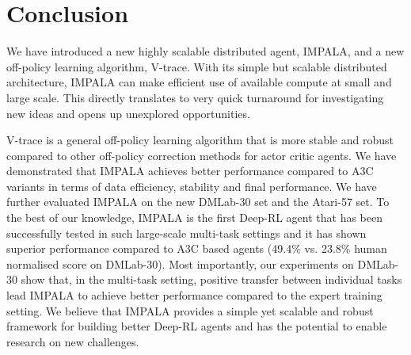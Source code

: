 \section{Conclusion}
We have introduced a new highly scalable distributed agent, IMPALA, and a new off-policy learning algorithm, V-trace. 
With its simple but scalable distributed architecture, IMPALA can make efficient use of available compute at small and large scale.
This directly translates to very quick turnaround for investigating new ideas and opens up unexplored opportunities.

V-trace is a general off-policy learning algorithm that is more stable and robust compared to other off-policy correction methods for actor critic agents. We have demonstrated that IMPALA achieves better performance compared to A3C variants in terms of data efficiency, stability and final performance. We have further evaluated IMPALA on the new DMLab-30 set and the Atari-57 set. To the best of our knowledge, IMPALA is the first Deep-RL agent that has been successfully tested in such large-scale multi-task settings and it has shown superior performance compared to A3C based agents (49.4\% vs. 23.8\% human normalised score on DMLab-30). Most importantly, our experiments on DMLab-30 show that, in the multi-task setting, positive transfer between individual tasks lead IMPALA to achieve better performance compared to the expert training setting. We believe that IMPALA provides a simple yet scalable and robust framework for building better Deep-RL agents and has the potential to enable research on new challenges.

